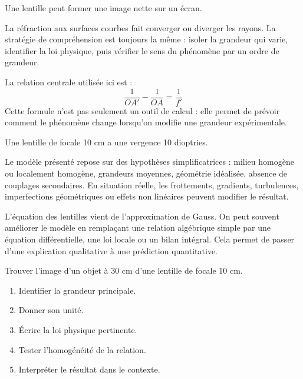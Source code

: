 \documentclass[11pt,a4paper]{article}
\begin{document}
\begin{exemplebox}
Une lentille peut former une image nette sur un écran.
\end{exemplebox}

\begin{methodebox}
La réfraction aux surfaces courbes fait converger ou diverger les rayons.
La stratégie de compréhension est toujours la même : isoler la grandeur qui varie, identifier la loi physique, puis vérifier le sens du phénomène par un ordre de grandeur.
\end{methodebox}

\begin{theorembox}
La relation centrale utilisée ici est :
\[
\frac{1}{OA'}-\frac{1}{OA}=\frac{1}{f'}
\]
Cette formule n'est pas seulement un outil de calcul : elle permet de prévoir comment le phénomène change lorsqu'on modifie une grandeur expérimentale.
\end{theorembox}

\begin{odgbox}
Une lentille de focale 10 cm a une vergence 10 dioptries.
\end{odgbox}

\begin{attentionbox}
Le modèle présenté repose sur des hypothèses simplificatrices : milieu homogène ou localement homogène, grandeurs moyennes, géométrie idéalisée, absence de couplages secondaires. En situation réelle, les frottements, gradients, turbulences, imperfections géométriques ou effets non linéaires peuvent modifier le résultat.
\end{attentionbox}

\begin{approfondissementbox}
L'équation des lentilles vient de l'approximation de Gauss.
On peut souvent améliorer le modèle en remplaçant une relation algébrique simple par une équation différentielle, une loi locale ou un bilan intégral. Cela permet de passer d'une explication qualitative à une prédiction quantitative.
\end{approfondissementbox}

\begin{exercicebox}
Trouver l'image d'un objet à 30 cm d'une lentille de focale 10 cm.
\begin{enumerate}
  \item Identifier la grandeur principale.
  \item Donner son unité.
  \item Écrire la loi physique pertinente.
  \item Tester l'homogénéité de la relation.
  \item Interpréter le résultat dans le contexte.
\end{enumerate}
\end{exercicebox}
\end{document}
